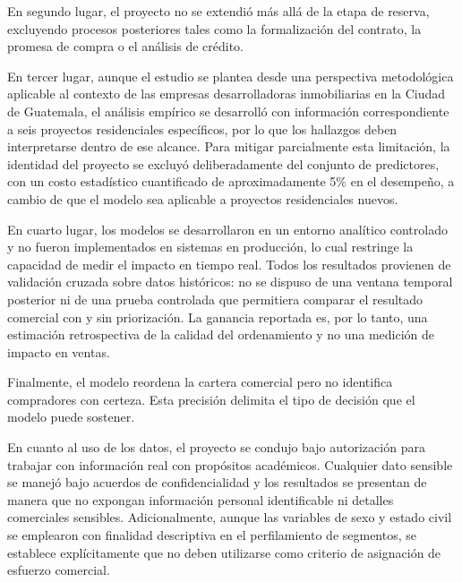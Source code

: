 En segundo lugar, el proyecto no se extendió más allá de la etapa de reserva, excluyendo procesos posteriores tales como la formalización del contrato, la promesa de compra o el análisis de crédito.

En tercer lugar, aunque el estudio se plantea desde una perspectiva metodológica aplicable al contexto de las empresas desarrolladoras inmobiliarias en la Ciudad de Guatemala, el análisis empírico se desarrolló con información correspondiente a seis proyectos residenciales específicos, por lo que los hallazgos deben interpretarse dentro de ese alcance. Para mitigar parcialmente esta limitación, la identidad del proyecto se excluyó deliberadamente del conjunto de predictores, con un costo estadístico cuantificado de aproximadamente 5\% en el desempeño, a cambio de que el modelo sea aplicable a proyectos residenciales nuevos.

En cuarto lugar, los modelos se desarrollaron en un entorno analítico controlado y no fueron implementados en sistemas en producción, lo cual restringe la capacidad de medir el impacto en tiempo real. Todos los resultados provienen de validación cruzada sobre datos históricos: no se dispuso de una ventana temporal posterior ni de una prueba controlada que permitiera comparar el resultado comercial con y sin priorización. La ganancia reportada es, por lo tanto, una estimación retrospectiva de la calidad del ordenamiento y no una medición de impacto en ventas.

Finalmente, el modelo reordena la cartera comercial pero no identifica compradores con certeza. Esta precisión delimita el tipo de decisión que el modelo puede sostener.

En cuanto al uso de los datos, el proyecto se condujo bajo autorización para trabajar con información real con propósitos académicos. Cualquier dato sensible se manejó bajo acuerdos de confidencialidad y los resultados se presentan de manera que no expongan información personal identificable ni detalles comerciales sensibles. Adicionalmente, aunque las variables de sexo y estado civil se emplearon con finalidad descriptiva en el perfilamiento de segmentos, se establece explícitamente que no deben utilizarse como criterio de asignación de esfuerzo comercial.